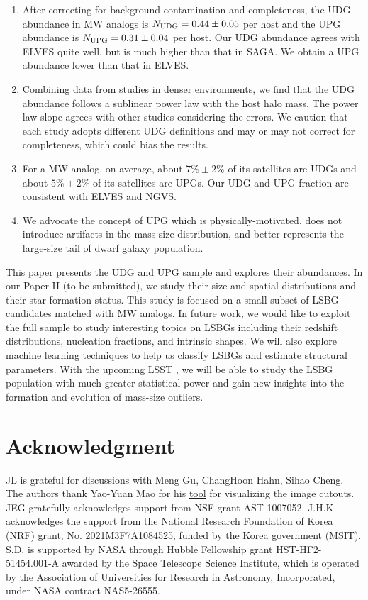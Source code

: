 \documentclass[twocolumn,astrosymb,twocolappendix]{aastex631}
\begin{document}
\begin{CJK*}{UTF8}{gbsn}
\begin{enumerate}
    \item After correcting for background contamination and completeness, the UDG abundance in MW analogs is $N_{\rm UDG} = 0.44\pm 0.05$ per host and the UPG abundance is $N_{\rm UPG} = 0.31 \pm 0.04$ per host. Our UDG abundance agrees with ELVES quite well, but is much higher than that in SAGA. We obtain a UPG abundance lower than that in ELVES.
    
    \item Combining data from studies in denser environments, we find that the UDG abundance follows a sublinear power law with the host halo mass. The power law slope agrees with other studies considering the errors. We caution that each study adopts different UDG definitions and may or may not correct for completeness, which could bias the results.
    
    \item For a MW analog, on average, about $7\%\pm2\%$ of its satellites are UDGs and about $5\%\pm2\%$ of its satellites are UPGs. Our UDG and UPG fraction are consistent with ELVES and NGVS.
    
    \item We advocate the concept of UPG which is physically-motivated, does not introduce artifacts in the mass-size distribution, and better represents the large-size tail of dwarf galaxy population. 
\end{enumerate}

This paper presents the UDG and UPG sample and explores their abundances. In our Paper II (to be submitted), we study their size and spatial distributions and their star formation status. This study is focused on a small subset of LSBG candidates matched with MW analogs. In future work, we would like to exploit the full sample to study interesting topics on LSBGs including their redshift distributions, nucleation fractions, and intrinsic shapes. We will also explore machine learning techniques to help us classify LSBGs and estimate structural parameters. With the upcoming LSST \citep{lsst2009,LSST2019}, we will be able to study the LSBG population with much greater statistical power and gain new insights into the formation and evolution of mass-size outliers. 

\section*{Acknowledgment}
JL is grateful for discussions with Meng Gu, ChangHoon Hahn, Sihao Cheng. The authors thank Yao-Yuan Mao for his \href{https://github.com/yymao/decals-image-list-tool}{tool} for visualizing the image cutouts. JEG gratefully acknowledges support from NSF grant AST-1007052. J.H.K acknowledges the support from the National Research Foundation of Korea (NRF) grant, No. 2021M3F7A1084525, funded by the Korea government (MSIT). S.D. is supported by NASA through Hubble Fellowship grant HST-HF2-51454.001-A awarded by the Space Telescope Science Institute, which is operated by the Association of Universities for Research in Astronomy, Incorporated, under NASA contract NAS5-26555.


\end{CJK*}
\end{document}
